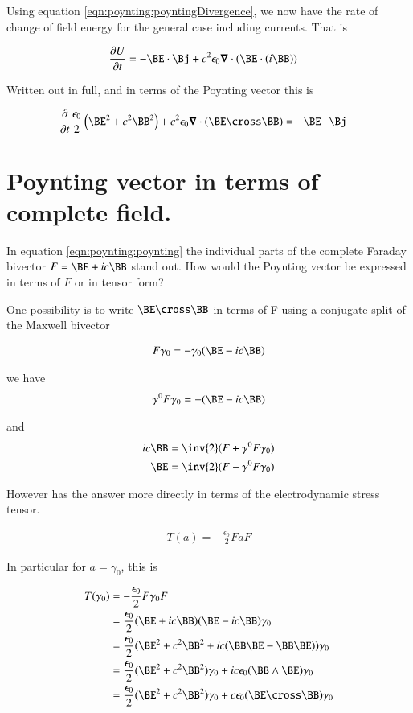 Using equation \ref{eqn:poynting:poyntingDivergence}, we now have the rate of change of
field energy for the general case including currents.  That is

\begin{align}
\PD{t}{U} &= -\BE \cdot \Bj + c^2 \epsilon_0 \spacegrad \cdot (\BE \cdot (i\BB)) 
\end{align}

Written out in full, and in terms of the Poynting vector this is

\begin{align}
\PD{t}{}\frac{\epsilon_0}{2} \left(\BE^2 + c^2 \BB^2\right) + c^2 \epsilon_0 \spacegrad \cdot (\BE \cross \BB) &= -\BE \cdot \Bj 
\end{align}

\section{Poynting vector in terms of complete field. }

In equation \ref{eqn:poynting:poynting} the individual parts of the complete Faraday
bivector $F = \BE + i c \BB$ stand out.  How would the Poynting vector be
expressed in terms of $F$ or in tensor form?

One possibility is to write $\BE \cross \BB$ in terms of F using 
a conjugate split of the Maxwell bivector

\begin{align*}
F \gamma_0 = - \gamma_0(\BE - i c \BB)
\end{align*}

we have
\begin{align*}
\gamma^0 F \gamma_0 = - (\BE - i c \BB)
\end{align*}

and
\begin{align*}
i c \BB &= \inv{2}(F + \gamma^0 F \gamma_0) \\
\BE &= \inv{2}(F - \gamma^0 F \gamma_0) \\
\end{align*}

However \cite{doran2003gap} has the answer more directly in terms of the 
electrodynamic stress tensor.

\begin{align*}
T(a) = -\frac{\epsilon_0}{2} F a F
\end{align*}

In particular for $a = \gamma_0$, this is

\begin{align*}
T(\gamma_0) 
&= -\frac{\epsilon_0}{2} F \gamma_0 F \\
&= \frac{\epsilon_0}{2} (\BE + i c\BB) (\BE - i c \BB) \gamma_0 \\
&= \frac{\epsilon_0}{2} (\BE^2 + c^2 \BB^2 + i c (\BB \BE -\BB \BE)) \gamma_0 \\
&= \frac{\epsilon_0}{2} (\BE^2 + c^2 \BB^2) \gamma_0 + i c \epsilon_0 (\BB \wedge \BE) \gamma_0 \\
&= \frac{\epsilon_0}{2} (\BE^2 + c^2 \BB^2) \gamma_0 + c \epsilon_0 (\BE \cross \BB) \gamma_0 \\
\end{align*}

